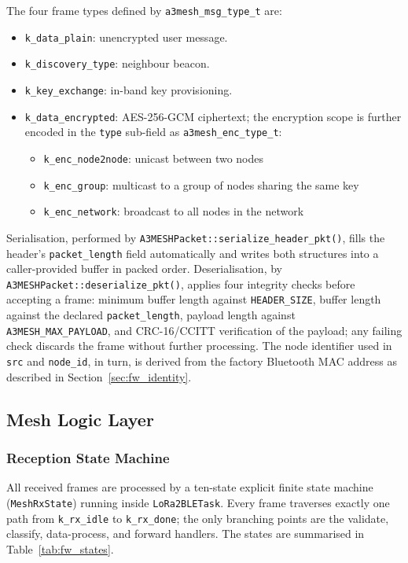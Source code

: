 \documentclass[english,bachelor]{tfgitic}[2026/01/22]
\begin{document}
The four frame types defined by \texttt{a3mesh\_msg\_type\_t} are:
\begin{itemize}
    \item \texttt{k\_data\_plain}: unencrypted user message.
    \item \texttt{k\_discovery\_type}: neighbour beacon.
    \item \texttt{k\_key\_exchange}: in-band key provisioning.
    \item \texttt{k\_data\_encrypted}: AES-256-GCM ciphertext; the encryption scope is further
encoded in the \texttt{type} sub-field as \texttt{a3mesh\_enc\_type\_t}:
    \begin{itemize}
        \item \texttt{k\_enc\_node2node}: unicast between two nodes
        \item \texttt{k\_enc\_group}: multicast to a group of nodes sharing the same key
        \item \texttt{k\_enc\_network}: broadcast to all nodes in the network
    \end{itemize}
\end{itemize}

Serialisation, performed by \texttt{A3MESHPacket::serialize\_header\_pkt()}, fills
the header's \texttt{packet\_length} field automatically and writes both structures
into a caller-provided buffer in packed order. Deserialisation, by
\texttt{A3MESHPacket::deserialize\_pkt()}, applies four integrity checks before
accepting a frame: minimum buffer length against \texttt{HEADER\_SIZE}, buffer
length against the declared \texttt{packet\_length}, payload length against
\texttt{A3MESH\_MAX\_PAYLOAD}, and CRC-16/CCITT verification of the payload; any
failing check discards the frame without further processing. The node identifier
used in \texttt{src} and \texttt{node\_id}, in turn, is derived from the factory
Bluetooth MAC address as described in Section~\ref{sec:fw_identity}.


\subsection{Mesh Logic Layer}
\label{sec:fw_mesh}

\subsubsection{Reception State Machine}
\label{sec:fw_statemachine}

All received frames are processed by a ten-state explicit finite state machine
(\texttt{MeshRxState}) running inside \texttt{LoRa2BLETask}. Every frame
traverses exactly one path from \texttt{k\_rx\_idle} to \texttt{k\_rx\_done}; the
only branching points are the validate, classify, data-process, and forward handlers.
The states are summarised in Table~\ref{tab:fw_states}.
\end{document}
